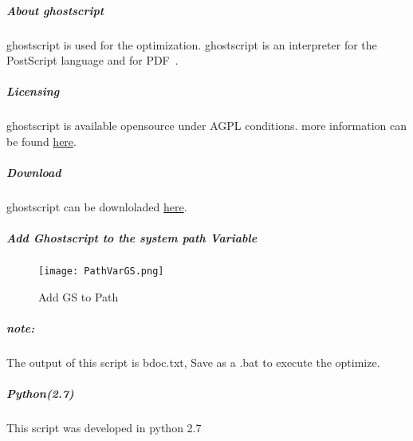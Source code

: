 \subparagraph{About ghostscript}
ghostscript is used for the optimization. ghostscript is an interpreter for the PostScript language and for PDF~\cite{ghostscript1}.
\subparagraph*{Licensing}
ghostscript is available opensource under AGPL conditions.  more information can be found \href{https://www.ghostscript.com/license.html}{here}.
\subparagraph*{Download}
ghostscript can be downloladed \href{https://www.ghostscript.com/download/gsdnld.html}{here}.

\subparagraph*{Add Ghostscript to the system path Variable}

\begin{figure}[h!]
  \centering
      \texttt{[image: PathVarGS.png]}
  \caption{Add GS to Path}
  \end{figure}
  \clearpage



\subparagraph*{\textit{note:}} The output of this script is bdoc.txt, Save as a .bat to execute the optimize.

\subparagraph{Python(2.7)} This script was developed in python 2.7

